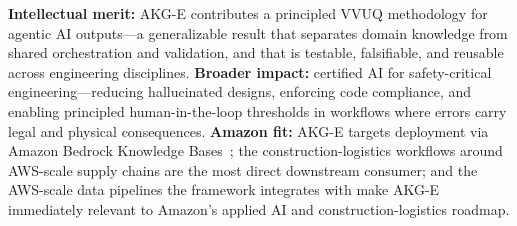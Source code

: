 \documentclass[conference, 10pt]{IEEEtran}
\begin{document}
\textbf{Intellectual merit:} AKG-E contributes a principled VVUQ methodology for agentic AI outputs---a generalizable result that separates domain knowledge from shared orchestration and validation, and that is testable, falsifiable, and reusable across engineering disciplines. \textbf{Broader impact:} certified AI for safety-critical engineering---reducing hallucinated designs, enforcing code compliance, and enabling principled human-in-the-loop thresholds in workflows where errors carry legal and physical consequences. \textbf{Amazon fit:} AKG-E targets deployment via Amazon Bedrock Knowledge Bases~\cite{AWSBedrockHybridSearch2024}; the construction-logistics workflows around AWS-scale supply chains are the most direct downstream consumer; and the AWS-scale data pipelines the framework integrates with make AKG-E immediately relevant to Amazon's applied AI and construction-logistics roadmap.



\end{document}
